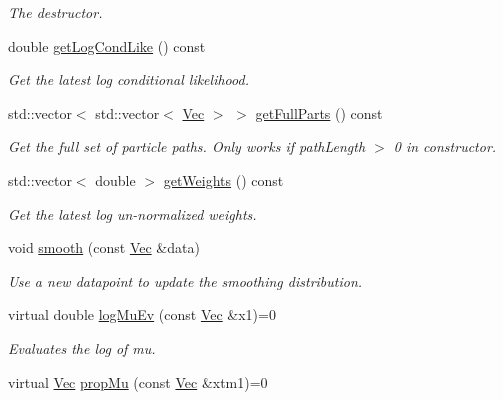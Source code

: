 \begin{DoxyCompactItemize}
\begin{DoxyCompactList}\small\item\em The destructor. \end{DoxyCompactList}\item 
double \hyperlink{classAPFSmoother_af78387b6b79bb2d3c3b44663e7fc31f3}{get\+Log\+Cond\+Like} () const 
\begin{DoxyCompactList}\small\item\em Get the latest log conditional likelihood. \end{DoxyCompactList}\item 
std\+::vector$<$ std\+::vector$<$ \hyperlink{apf__filter_8h_a4c7df05c6f5e8a0d15ae14bcdbc07152}{Vec} $>$ $>$ \hyperlink{classAPFSmoother_af9bd42db37a53bc03f238a6db829102c}{get\+Full\+Parts} () const 
\begin{DoxyCompactList}\small\item\em Get the full set of particle paths. Only works if path\+Length $>$ 0 in constructor. \end{DoxyCompactList}\item 
std\+::vector$<$ double $>$ \hyperlink{classAPFSmoother_a6bc97edb04f65e1f038f753b9fb2dd9c}{get\+Weights} () const 
\begin{DoxyCompactList}\small\item\em Get the latest log un-\/normalized weights. \end{DoxyCompactList}\item 
void \hyperlink{classAPFSmoother_acaf872bc7356e60198fedce0665afeb6}{smooth} (const \hyperlink{apf__filter_8h_a4c7df05c6f5e8a0d15ae14bcdbc07152}{Vec} \&data)
\begin{DoxyCompactList}\small\item\em Use a new datapoint to update the smoothing distribution. \end{DoxyCompactList}\item 
virtual double \hyperlink{classAPFSmoother_a6afc79350b182fe4083936d1abd2beda}{log\+Mu\+Ev} (const \hyperlink{apf__filter_8h_a4c7df05c6f5e8a0d15ae14bcdbc07152}{Vec} \&x1)=0
\begin{DoxyCompactList}\small\item\em Evaluates the log of mu. \end{DoxyCompactList}\item 
virtual \hyperlink{apf__filter_8h_a4c7df05c6f5e8a0d15ae14bcdbc07152}{Vec} \hyperlink{classAPFSmoother_a8c95c24e4e6f5699ef6f9b95c64fc9eb}{prop\+Mu} (const \hyperlink{apf__filter_8h_a4c7df05c6f5e8a0d15ae14bcdbc07152}{Vec} \&xtm1)=0

\end{DoxyCompactItemize}

